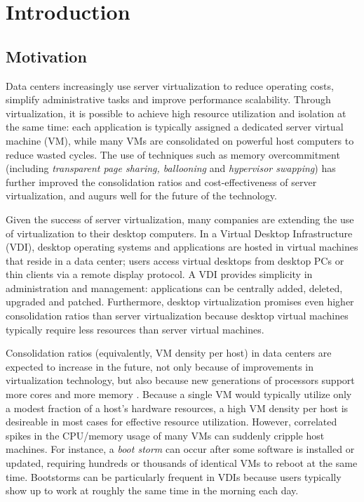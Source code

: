 \chapter{Introduction}
\section{Motivation}
Data centers increasingly use server virtualization to
reduce operating costs, simplify administrative tasks and improve 
performance scalability. Through virtualization, it is
possible to achieve high resource utilization and isolation at the same time:
each application is typically assigned a dedicated server virtual machine (VM), 
while many VMs are consolidated on powerful host computers
to reduce wasted cycles. The use of techniques such as memory overcommitment (including 
\emph{transparent page sharing, ballooning} and \emph{hypervisor swapping}) \cite{waldspurger2002memory} 
has further improved the consolidation ratios and cost-effectiveness 
of server virtualization, and augurs well for the future of the technology.

Given the success of server virtualization, many companies are 
extending the use of virtualization to their desktop computers.
In a Virtual Desktop Infrastructure \cite{vmwarevdi} (VDI), 
desktop operating systems and applications are hosted in 
virtual machines that reside in a data center; 
users access virtual desktops from desktop PCs or thin clients
via a remote display protocol. A VDI provides simplicity 
in administration and management: applications
can be centrally added, deleted, upgraded and patched. 
Furthermore, desktop virtualization promises even
higher consolidation ratios than server virtualization
because desktop virtual machines typically require
less resources than server virtual machines.

Consolidation ratios (equivalently, VM density per host) in data centers
are expected to increase in the future, not only because of
improvements in virtualization technology, but also because
new generations of processors support more cores and 
more memory \cite{hansen2010lithium}. 
Because a single VM would typically utilize only a modest fraction of a 
host's hardware resources, a high VM density per host is
desireable in most cases for effective resource utilization. 
However, correlated spikes in the CPU/memory usage of many VMs can suddenly 
cripple host machines. For instance, a \emph{boot storm} \cite{hansen2010lithium, 
liao2011vmstore, meng2010tide, rajan2010vdc, vaghani2010virtual}
can occur after some software is installed or updated, requiring hundreds 
or thousands of identical VMs to reboot at the same time.
Bootstorms can be particularly frequent in VDIs because 
users typically show up to work at roughly the same time
in the morning each day. 

